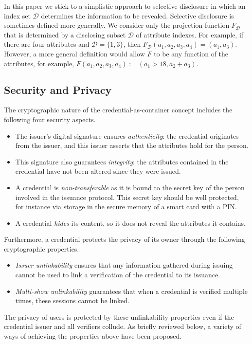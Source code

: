 In this paper we stick to a simplistic approach to selective disclosure in which
an index set $\mathcal{D}$ determines the information to be revealed. Selective
disclosure is sometimes defined more generally. We consider only the projection
function $F_{\mathcal{D}}$ that is determined by a disclosing subset
$\mathcal{D}$ of attribute indexes. For example, if there are four attributes
and $\mathcal{D}=\{1,3\}$, then
$F_{\mathcal{D}}(a_1, a_2, a_3, a_4)= (a_1, a_3)$. However, a more general
definition would allow $F$ to be any function of the attributes, for example,
$F(a_1, a_2, a_3, a_4):=(a_1>18, a_2+a_3)$.

\subsection{Security and Privacy}

The cryptographic nature of the credential-as-container concept includes the
following four security aspects.
\begin{itemize}
  \item The issuer's digital signature ensures \emph{authenticity}: the
    credential originates from the issuer, and this issuer asserts that the
    attributes hold for the person.
  \item This signature also guarantees \emph{integrity}: the attributes
    contained in the credential have not been altered since they were issued.
  \item A credential is \emph{non-transferable} as it is bound to the secret
    key of the person involved in the issuance protocol. This secret key should
    be well protected, for instance via storage in the secure memory of a smart
    card with a PIN.
  \item A credential \emph{hides} its content, so it does not reveal the
    attributes it contains.
\end{itemize}
Furthermore, a credential protects the privacy of its owner through the
following cryptographic properties.
\begin{itemize}
  \item \emph{Issuer unlinkability} ensures that any information gathered
    during issuing cannot be used to link a verification of the credential to
    its issuance.
  \item \emph{Multi-show unlinkability} guarantees that when a credential is
    verified multiple times, these sessions cannot be linked.
\end{itemize}
The privacy of users is protected by these unlinkability properties even if the
credential issuer and all verifiers collude. As briefly reviewed below, a
variety of ways of achieving the properties above have been proposed.

